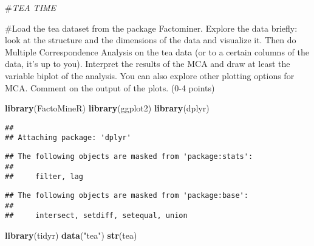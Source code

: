 \documentclass[]{article}
\title{}
\author{}
\date{}
\newenvironment{Shaded}{\begin{snugshade}}{\end{snugshade}}
\newcommand{\KeywordTok}[1]{\textcolor[rgb]{0.13,0.29,0.53}{\textbf{#1}}}
\newcommand{\NormalTok}[1]{#1}
\newcommand{\StringTok}[1]{\textcolor[rgb]{0.31,0.60,0.02}{#1}}
\begin{document}
\#\emph{TEA TIME}

\#Load the tea dataset from the package Factominer. Explore the data
briefly: look at the structure and the dimensions of the data and
visualize it. Then do Multiple Correspondence Analysis on the tea data
(or to a certain columns of the data, it's up to you). Interpret the
results of the MCA and draw at least the variable biplot of the
analysis. You can also explore other plotting options for MCA. Comment
on the output of the plots. (0-4 points)

\begin{Shaded}
\begin{Highlighting}[]
\KeywordTok{library}\NormalTok{(FactoMineR)}
\KeywordTok{library}\NormalTok{(ggplot2)}
\KeywordTok{library}\NormalTok{(dplyr)}
\end{Highlighting}
\end{Shaded}

\begin{verbatim}
## 
## Attaching package: 'dplyr'
\end{verbatim}

\begin{verbatim}
## The following objects are masked from 'package:stats':
## 
##     filter, lag
\end{verbatim}

\begin{verbatim}
## The following objects are masked from 'package:base':
## 
##     intersect, setdiff, setequal, union
\end{verbatim}

\begin{Shaded}
\begin{Highlighting}[]
\KeywordTok{library}\NormalTok{(tidyr)}
\KeywordTok{data}\NormalTok{(}\StringTok{"tea"}\NormalTok{)}
\KeywordTok{str}\NormalTok{(tea)}
\end{Highlighting}
\end{Shaded}
\end{document}
